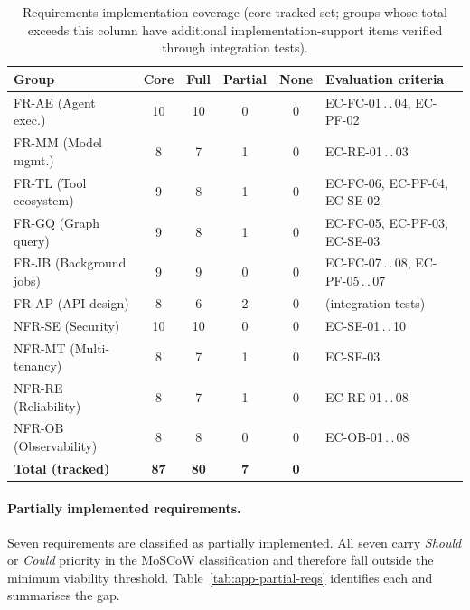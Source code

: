 \documentclass[a4paper]{sapthesis}
\begin{document}
\begin{table}[ht]
\centering
\caption{Requirements implementation coverage (core-tracked set;
    groups whose total exceeds this column have additional
    implementation-support items verified through integration tests).}
\label{tab:app-req-coverage}
\footnotesize
\begin{tabularx}{\textwidth}{@{}l c c c c X@{}}
    \hline
    \textbf{Group} & \textbf{Core} & \textbf{Full} & \textbf{Partial}
        & \textbf{None} & \textbf{Evaluation criteria} \\
    \hline
    FR-AE (Agent exec.)     & 10 & 10 & 0 & 0 & EC-FC-01\,.\,.\,04, EC-PF-02 \\
    FR-MM (Model mgmt.)     &  8 &  7 & 1 & 0 & EC-RE-01\,.\,.\,03 \\
    FR-TL (Tool ecosystem)  &  9 &  8 & 1 & 0 & EC-FC-06, EC-PF-04, EC-SE-02 \\
    FR-GQ (Graph query)     &  9 &  8 & 1 & 0 & EC-FC-05, EC-PF-03, EC-SE-03 \\
    FR-JB (Background jobs) &  9 &  9 & 0 & 0 & EC-FC-07\,.\,.\,08, EC-PF-05\,.\,.\,07 \\
    FR-AP (API design)      &  8 &  6 & 2 & 0 & (integration tests) \\
    NFR-SE (Security)       & 10 & 10 & 0 & 0 & EC-SE-01\,.\,.\,10 \\
    NFR-MT (Multi-tenancy)  &  8 &  7 & 1 & 0 & EC-SE-03 \\
    NFR-RE (Reliability)    &  8 &  7 & 1 & 0 & EC-RE-01\,.\,.\,08 \\
    NFR-OB (Observability)  &  8 &  8 & 0 & 0 & EC-OB-01\,.\,.\,08 \\
    \hline
    \textbf{Total (tracked)} & \textbf{87} & \textbf{80} & \textbf{7}
        & \textbf{0} & \\
    \hline
\end{tabularx}
\end{table}

\paragraph{Partially implemented requirements.}
Seven requirements are classified as partially implemented.  All seven
carry \emph{Should} or \emph{Could} priority in the MoSCoW
classification and therefore fall outside the minimum viability
threshold.  Table~\ref{tab:app-partial-reqs} identifies each and
summarises the gap.
\end{document}
